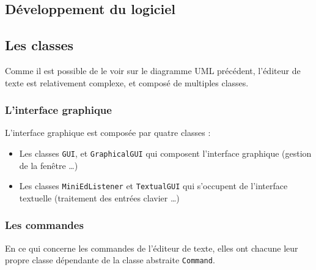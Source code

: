 \documentclass[a4paper]{article}
\begin{document}

	\begin{center}
		\section{Développement du logiciel}
	\end{center}

	\vspace{0.5cm}

		\subsection{Les classes}

		\vspace{0.5cm}

		Comme il est possible de le voir sur le diagramme UML précédent, l'éditeur de texte est relativement complexe, et composé de multiples classes. 

		\vspace{0.5cm}

			\subsubsection{L'interface graphique}

			L'interface graphique est composée par quatre classes :

			\begin{itemize}
				\item Les classes \texttt{GUI}, et \texttt{GraphicalGUI} qui composent l'interface graphique (gestion de la fenêtre \dots)

				\item Les classes \texttt{MiniEdListener} et \texttt{TextualGUI} qui s'occupent de l'interface textuelle (traitement des entrées clavier \dots)
			\end{itemize}

			\subsubsection{Les commandes}

			En ce qui concerne les commandes de l'éditeur de texte, elles ont chacune leur propre classe dépendante de la classe abstraite \texttt{Command}.
\end{document}
